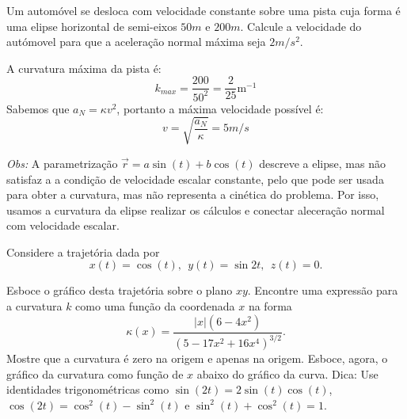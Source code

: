 \begin{exeresol}
Um automóvel se desloca com velocidade constante sobre uma pista cuja forma é uma elipse horizontal de semi-eixos $50m$ e $200m$. Calcule a velocidade do autómovel para que a aceleração normal máxima seja $2m/s^2$.

\end{exeresol}
\begin{resol}
  A curvatura máxima da pista é:
  $$k_{max}=\frac{200}{50^2}=\frac{2}{25}\text{m}^{-1}$$
  Sabemos que $a_N=\kappa v^2$, portanto a máxima velocidade possível é:
  $$v=\sqrt{\frac{a_N}{\kappa}}=5m/s$$

  {\it Obs:}
 A parametrização $\vec{r}=a\sin (t) + b\cos (t)$ descreve a elipse, mas não satisfaz a a condição de velocidade escalar constante, pelo que pode ser usada para obter a curvatura, mas não representa a cinética do problema. Por isso, usamos a curvatura da elipse realizar os cálculos e conectar aleceração normal com velocidade escalar.
\end{resol}
\begin{exeresol}
Considere a trajetória  dada por
$$x(t)=\cos(t),~~  y(t)=\sin 2t,~~ z(t)=0.$$

Esboce o gráfico desta trajetória sobre o plano $xy$. Encontre uma expressão para a curvatura $k$ como uma função da coordenada $x$ na forma $$\kappa(x)=\frac{|x|(6-4x^2)}{\left(5-17x^2+16x^4\right)^{3/2}}.$$ Mostre que a curvatura é zero na origem e apenas na origem. Esboce, agora, o gráfico da curvatura como função de $x$ abaixo do gráfico da curva.
Dica: Use identidades trigonométricas como $\sin(2t)=2\sin(t)\cos(t)$, $\cos(2t)=\cos^2(t)-\sin^2(t)$ e $\sin^2(t)+\cos^2(t)=1$.
\end{exeresol}
